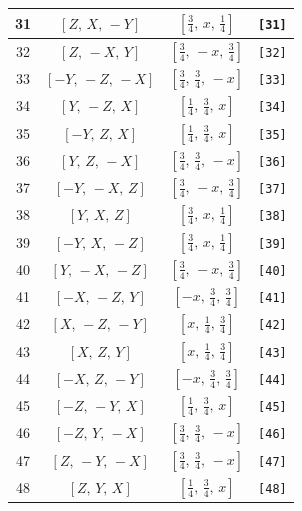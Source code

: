 \documentclass[fleqn,8pt]{jsarticle}
\begin{document}
\begin{longtable}{cccc}
31 & $\left[ Z,\, X,\, - Y \right]$ & $\left[ \frac{3}{4},\, x,\, \frac{1}{4} \right]$ & {\tt [31]} \\ \hline
32 & $\left[ Z,\, - X,\, Y \right]$ & $\left[ \frac{3}{4},\, - x,\, \frac{3}{4} \right]$ & {\tt [32]} \\ \hline
33 & $\left[ - Y,\, - Z,\, - X \right]$ & $\left[ \frac{3}{4},\, \frac{3}{4},\, - x \right]$ & {\tt [33]} \\ \hline
34 & $\left[ Y,\, - Z,\, X \right]$ & $\left[ \frac{1}{4},\, \frac{3}{4},\, x \right]$ & {\tt [34]} \\ \hline
35 & $\left[ - Y,\, Z,\, X \right]$ & $\left[ \frac{1}{4},\, \frac{3}{4},\, x \right]$ & {\tt [35]} \\ \hline
36 & $\left[ Y,\, Z,\, - X \right]$ & $\left[ \frac{3}{4},\, \frac{3}{4},\, - x \right]$ & {\tt [36]} \\ \hline
37 & $\left[ - Y,\, - X,\, Z \right]$ & $\left[ \frac{3}{4},\, - x,\, \frac{3}{4} \right]$ & {\tt [37]} \\ \hline
38 & $\left[ Y,\, X,\, Z \right]$ & $\left[ \frac{3}{4},\, x,\, \frac{1}{4} \right]$ & {\tt [38]} \\ \hline
39 & $\left[ - Y,\, X,\, - Z \right]$ & $\left[ \frac{3}{4},\, x,\, \frac{1}{4} \right]$ & {\tt [39]} \\ \hline
40 & $\left[ Y,\, - X,\, - Z \right]$ & $\left[ \frac{3}{4},\, - x,\, \frac{3}{4} \right]$ & {\tt [40]} \\ \hline
41 & $\left[ - X,\, - Z,\, Y \right]$ & $\left[ - x,\, \frac{3}{4},\, \frac{3}{4} \right]$ & {\tt [41]} \\ \hline
42 & $\left[ X,\, - Z,\, - Y \right]$ & $\left[ x,\, \frac{1}{4},\, \frac{3}{4} \right]$ & {\tt [42]} \\ \hline
43 & $\left[ X,\, Z,\, Y \right]$ & $\left[ x,\, \frac{1}{4},\, \frac{3}{4} \right]$ & {\tt [43]} \\ \hline
44 & $\left[ - X,\, Z,\, - Y \right]$ & $\left[ - x,\, \frac{3}{4},\, \frac{3}{4} \right]$ & {\tt [44]} \\ \hline
45 & $\left[ - Z,\, - Y,\, X \right]$ & $\left[ \frac{1}{4},\, \frac{3}{4},\, x \right]$ & {\tt [45]} \\ \hline
46 & $\left[ - Z,\, Y,\, - X \right]$ & $\left[ \frac{3}{4},\, \frac{3}{4},\, - x \right]$ & {\tt [46]} \\ \hline
47 & $\left[ Z,\, - Y,\, - X \right]$ & $\left[ \frac{3}{4},\, \frac{3}{4},\, - x \right]$ & {\tt [47]} \\ \hline
48 & $\left[ Z,\, Y,\, X \right]$ & $\left[ \frac{1}{4},\, \frac{3}{4},\, x \right]$ & {\tt [48]} \\
\end{longtable}
\end{document}
